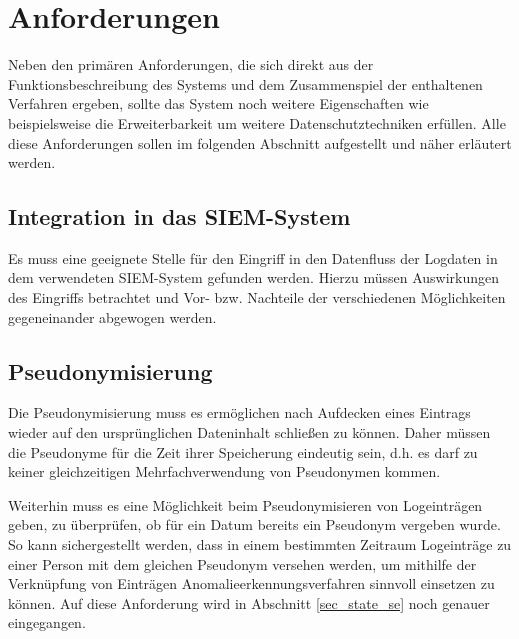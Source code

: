 \section{Anforderungen}

\label{sec_impl_requirements}

Neben den primären Anforderungen, die sich direkt aus der Funktionsbeschreibung des Systems und dem Zusammenspiel der enthaltenen Verfahren ergeben, sollte das System noch weitere Eigenschaften wie beispielsweise die Erweiterbarkeit um weitere Datenschutztechniken erfüllen. Alle diese Anforderungen sollen im folgenden Abschnitt aufgestellt und näher erläutert werden.

\subsection{Integration in das SIEM-System}

\label{subsec_impl_requirements_ossimintegration}

Es muss eine geeignete Stelle für den Eingriff in den Datenfluss der Logdaten in dem verwendeten SIEM-System gefunden werden. Hierzu müssen Auswirkungen des Eingriffs betrachtet und Vor- bzw. Nachteile der verschiedenen Möglichkeiten gegeneinander abgewogen werden. 

\subsection{Pseudonymisierung}

\label{subsec_impl_requirements_pseudonymity}


Die Pseudonymisierung muss es ermöglichen nach Aufdecken eines Eintrags wieder auf den ursprünglichen Dateninhalt schließen zu können. Daher müssen die Pseudonyme für die Zeit ihrer Speicherung eindeutig sein, d.h. es darf zu keiner gleichzeitigen Mehrfachverwendung von Pseudonymen kommen. 

Weiterhin muss es eine Möglichkeit beim Pseudonymisieren von Logeinträgen geben, zu überprüfen, ob für ein Datum bereits ein Pseudonym vergeben wurde. So kann sichergestellt werden, dass in einem bestimmten Zeitraum Logeinträge zu einer Person mit dem gleichen Pseudonym versehen werden, um mithilfe der Verknüpfung von Einträgen Anomalieerkennungsverfahren sinnvoll einsetzen zu können. Auf diese Anforderung wird in Abschnitt \ref{sec_state_se} noch genauer eingegangen.

